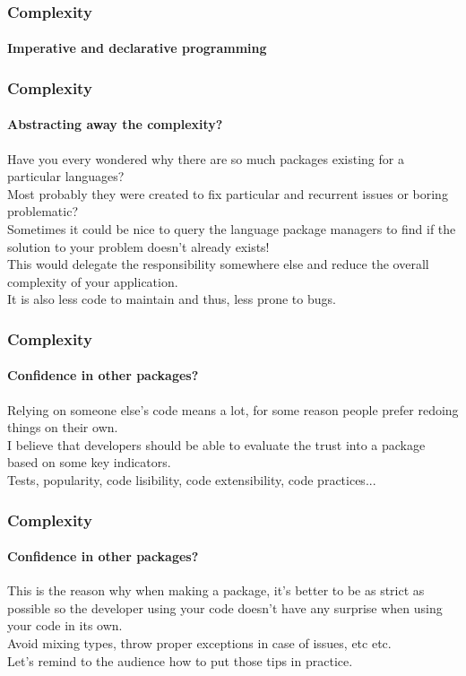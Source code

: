 \begin{frame}
    \frametitle{Complexity}
    \framesubtitle{Imperative and declarative programming}


\pause

\end{frame}

\begin{frame}
    \frametitle{Complexity}
    \framesubtitle{Abstracting away the complexity?}

    Have you every wondered why there are so much packages existing for a
    particular languages?\\
    \pause
    Most probably they were created to fix particular and recurrent issues or
    boring problematic?\\
    \pause
    Sometimes it could be nice to query the language package managers to find if
    the solution to your problem doesn't already exists!\\
    \pause
    This would delegate the responsibility somewhere else and reduce the overall
    complexity of your application.\\
    \pause
    It is also less code to maintain and thus, less prone to bugs.
\end{frame}

\begin{frame}
    \frametitle{Complexity}
    \framesubtitle{Confidence in other packages?}

    Relying on someone else's code means a lot, for some reason people prefer
    redoing things on their own.\\
    \pause
    I believe that developers should be able to evaluate the trust into a
    package based on some key indicators.\\
    \pause
    Tests, popularity, code lisibility, code extensibility, code practices...
\end{frame}

\begin{frame}
    \frametitle{Complexity}
    \framesubtitle{Confidence in other packages?}

    This is the reason why when making a package, it's better to be as strict
    as possible so the developer using your code doesn't have any surprise when
    using your code in its own.\\
    \pause
    Avoid mixing types, throw proper exceptions in case of issues, etc etc.\\
    \pause
    Let's remind to the audience how to put those tips in practice.
\end{frame}
